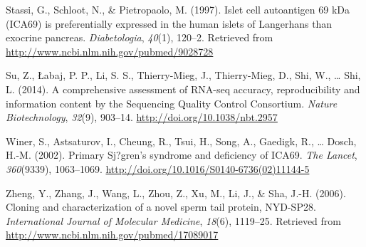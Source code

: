 \documentclass[12pt,twoside]{reedthesis}
\theoremstyle{definition}
\theoremstyle{definition}
\theoremstyle{remark}
\begin{document}
  \hypertarget{ref-Stassi1997}{}
  Stassi, G., Schloot, N., \& Pietropaolo, M. (1997). Islet cell
  autoantigen 69 kDa (ICA69) is preferentially expressed in the human
  islets of Langerhans than exocrine pancreas. \emph{Diabetologia},
  \emph{40}(1), 120--2. Retrieved from
  \url{http://www.ncbi.nlm.nih.gov/pubmed/9028728}
  
  \hypertarget{ref-Su2014}{}
  Su, Z., Łabaj, P. P., Li, S. S., Thierry-Mieg, J., Thierry-Mieg, D.,
  Shi, W., \ldots{} Shi, L. (2014). A comprehensive assessment of RNA-seq
  accuracy, reproducibility and information content by the Sequencing
  Quality Control Consortium. \emph{Nature Biotechnology}, \emph{32}(9),
  903--14. \url{http://doi.org/10.1038/nbt.2957}
  
  \hypertarget{ref-Winer2002}{}
  Winer, S., Astsaturov, I., Cheung, R., Tsui, H., Song, A., Gaedigk, R.,
  \ldots{} Dosch, H.-M. (2002). Primary Sj?gren's syndrome and deficiency
  of ICA69. \emph{The Lancet}, \emph{360}(9339), 1063--1069.
  \url{http://doi.org/10.1016/S0140-6736(02)11144-5}
  
  \hypertarget{ref-Zheng2006}{}
  Zheng, Y., Zhang, J., Wang, L., Zhou, Z., Xu, M., Li, J., \& Sha, J.-H.
  (2006). Cloning and characterization of a novel sperm tail protein,
  NYD-SP28. \emph{International Journal of Molecular Medicine},
  \emph{18}(6), 1119--25. Retrieved from
  \url{http://www.ncbi.nlm.nih.gov/pubmed/17089017}


\end{document}
